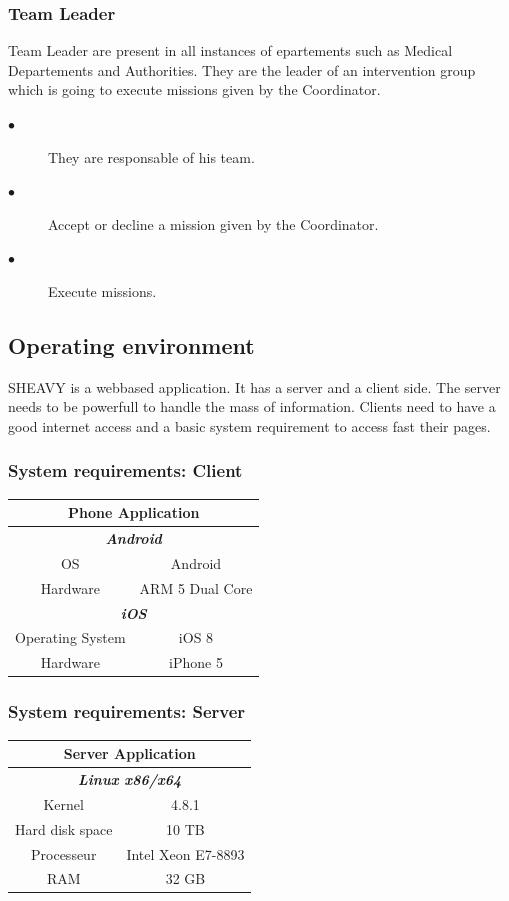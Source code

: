 \subsubsection{Team Leader}
Team Leader are present in all instances of epartements such as Medical
Departements and Authorities. They are the leader of an intervention group which
is going to execute missions given by the Coordinator.
\begin{description}
 \item[$\bullet$] They are responsable of his team.
 \item[$\bullet$] Accept or decline a mission given by the Coordinator.
 \item[$\bullet$] Execute missions.
\end{description}

\subsection{Operating environment}
SHEAVY is a webbased application. It has a server and a client side. The server
needs to be powerfull to handle the mass of information. Clients need to have a
good internet access and a basic system requirement to access fast their
pages.\\

\subsubsection{System requirements: Client}
\begin{tabular}{|c|c|}
\hline
\multicolumn{2}{|c|}{\textbf{Phone Application}} \\
\hline
\multicolumn{2}{|c|}{\textit{\textbf{Android}}} \\
\hline
OS & Android \\
\hline
Hardware & ARM 5 Dual Core \\
\hline
\multicolumn{2}{|c|}{\textit{\textbf{iOS}}} \\
\hline
Operating System & iOS 8 \\
\hline
Hardware & iPhone 5 \\
\hline
\end{tabular}

\subsubsection{System requirements: Server}
\begin{tabular}{|c|c|}
\hline
\multicolumn{2}{|c|}{\textbf{Server Application}} \\
\hline
\multicolumn{2}{|c|}{\textit{\textbf{Linux x86/x64}}} \\
\hline
Kernel & 4.8.1 \\
\hline
Hard disk space & 10 TB   \\
\hline
Processeur & Intel Xeon E7-8893 \\
\hline
RAM & 32 GB \\
\hline
\end{tabular}

